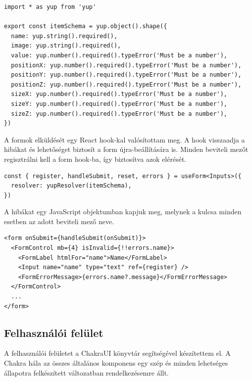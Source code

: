 \begin{lstlisting}[style=ES6, caption={Esköz validációs séma}]
import * as yup from 'yup'

export const itemSchema = yup.object().shape({
  name: yup.string().required(),
  image: yup.string().required(),
  value: yup.number().required().typeError('Must be a number'),
  positionX: yup.number().required().typeError('Must be a number'),
  positionY: yup.number().required().typeError('Must be a number'),
  positionZ: yup.number().required().typeError('Must be a number'),
  sizeX: yup.number().required().typeError('Must be a number'),
  sizeY: yup.number().required().typeError('Must be a number'),
  sizeZ: yup.number().required().typeError('Must be a number'),
})
\end{lstlisting}

A formok elküldését egy React hook-kal valósítottam meg.
A hook visszaadja a hibákat és lehetőséget biztosít a form újra-beállítására is.
Minden beviteli mezőt regisztrálni kell a form hook-ba, így biztosítva azok elérését.

\begin{lstlisting}[style=ES6, caption={Regisztrációnál használt form hook}]
const { register, handleSubmit, reset, errors } = useForm<Inputs>({
  resolver: yupResolver(itemSchema),
})
\end{lstlisting}

A hibákat egy JavaScript objektumban kapjuk meg, melynek a kulcsa minden esetben az adott beviteli mező neve.

\begin{lstlisting}[style=ES6, caption={Form}]
<form onSubmit={handleSubmit(onSubmit)}>
  <FormControl mb={4} isInvalid={!!errors.name}>
    <FormLabel htmlFor="name">Name</FormLabel>
    <Input name="name" type="text" ref={register} />
    <FormErrorMessage>{errors.name?.message}</FormErrorMessage>
  </FormControl>
  ...
</form>
\end{lstlisting}


\subsection{Felhasználói felület}
A felhasználói felületet a ChakraUI könyvtár segítségével készítettem el.
A Chakra hála az összes általános komponens egy szép és minden lehetséges állapotra felkészített változatban rendelkezésemre állt.

